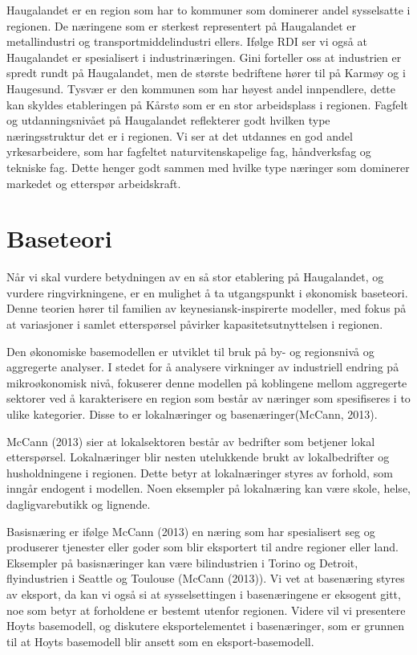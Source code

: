 \documentclass[
]{article}
\begin{document}
Haugalandet er en region som har to kommuner som dominerer andel
sysselsatte i regionen. De næringene som er sterkest representert på
Haugalandet er metallindustri og transportmiddelindustri ellers. Ifølge
RDI ser vi også at Haugalandet er spesialisert i industrinæringen. Gini
forteller oss at industrien er spredt rundt på Haugalandet, men de
største bedriftene hører til på Karmøy og i Haugesund. Tysvær er den
kommunen som har høyest andel innpendlere, dette kan skyldes
etableringen på Kårstø som er en stor arbeidsplass i regionen. Fagfelt
og utdanningsnivået på Haugalandet reflekterer godt hvilken type
næringsstruktur det er i regionen. Vi ser at det utdannes en god andel
yrkesarbeidere, som har fagfeltet naturvitenskapelige fag, håndverksfag
og tekniske fag. Dette henger godt sammen med hvilke type næringer som
dominerer markedet og etterspør arbeidskraft.

\newpage

\hypertarget{baseteori}{%
\section{Baseteori}\label{baseteori}}

Når vi skal vurdere betydningen av en så stor etablering på Haugalandet,
og vurdere ringvirkningene, er en mulighet å ta utgangspunkt i økonomisk
baseteori. Denne teorien hører til familien av keynesiansk-inspirerte
modeller, med fokus på at variasjoner i samlet etterspørsel påvirker
kapasitetsutnyttelsen i regionen.

Den økonomiske basemodellen er utviklet til bruk på by- og regionsnivå
og aggregerte analyser. I stedet for å analysere virkninger av
industriell endring på mikroøkonomisk nivå, fokuserer denne modellen på
koblingene mellom aggregerte sektorer ved å karakterisere en region som
består av næringer som spesifiseres i to ulike kategorier. Disse to er
lokalnæringer og basenæringer(McCann, 2013).

McCann (2013) sier at lokalsektoren består av bedrifter som betjener
lokal etterspørsel. Lokalnæringer blir nesten utelukkende brukt av
lokalbedrifter og husholdningene i regionen. Dette betyr at
lokalnæringer styres av forhold, som inngår endogent i modellen. Noen
eksempler på lokalnæring kan være skole, helse, dagligvarebutikk og
lignende.

Basisnæring er ifølge McCann (2013) en næring som har spesialisert seg
og produserer tjenester eller goder som blir eksportert til andre
regioner eller land. Eksempler på basisnæringer kan være bilindustrien i
Torino og Detroit, flyindustrien i Seattle og Toulouse (McCann (2013)).
Vi vet at basenæring styres av eksport, da kan vi også si at
sysselsettingen i basenæringene er eksogent gitt, noe som betyr at
forholdene er bestemt utenfor regionen. Videre vil vi presentere Hoyts
basemodell, og diskutere eksportelementet i basenæringer, som er grunnen
til at Hoyts basemodell blir ansett som en eksport-basemodell.
\end{document}
